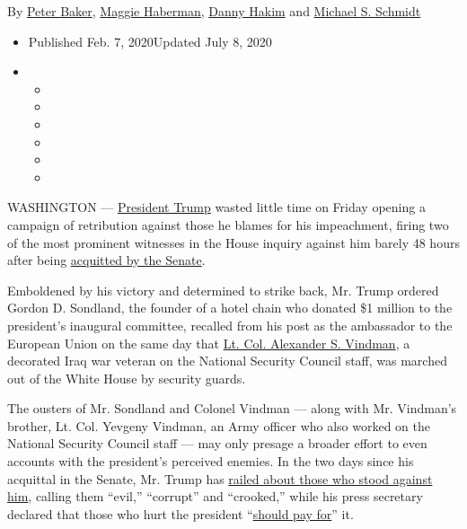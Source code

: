By \href{https://www.nytimes.com/by/peter-baker}{Peter Baker},
\href{https://www.nytimes.com/by/maggie-haberman}{Maggie Haberman},
\href{https://www.nytimes.com/by/danny-hakim}{Danny Hakim} and
\href{https://www.nytimes.com/by/michael-s-schmidt}{Michael S. Schmidt}

\begin{itemize}
\item
  Published Feb. 7, 2020Updated July 8, 2020
\item
  \begin{itemize}
  \item
  \item
  \item
  \item
  \item
  \item
  \end{itemize}
\end{itemize}

WASHINGTON ---
\href{https://www.nytimes.com/2020/02/14/podcasts/the-daily/trump-acquittal.html?action=click\&module=Briefings\&pgtype=Homepage}{President
Trump} wasted little time on Friday opening a campaign of retribution
against those he blames for his impeachment, firing two of the most
prominent witnesses in the House inquiry against him barely 48 hours
after being
\href{https://www.nytimes.com/2020/02/05/us/politics/trump-acquitted-impeachment.html}{acquitted
by the Senate}.

Emboldened by his victory and determined to strike back, Mr. Trump
ordered Gordon D. Sondland, the founder of a hotel chain who donated \$1
million to the president's inaugural committee, recalled from his post
as the ambassador to the European Union on the same day that
\href{https://www.nytimes.com/2020/07/08/us/politics/vindman-trump-ukraine-impeachment.html}{Lt.
Col. Alexander S. Vindman}, a decorated Iraq war veteran on the National
Security Council staff, was marched out of the White House by security
guards.

The ousters of Mr. Sondland and Colonel Vindman --- along with Mr.
Vindman's brother, Lt. Col. Yevgeny Vindman, an Army officer who also
worked on the National Security Council staff --- may only presage a
broader effort to even accounts with the president's perceived enemies.
In the two days since his acquittal in the Senate, Mr. Trump has
\href{https://www.nytimes.com/2020/02/06/us/politics/trump-impeachment.html}{railed
about those who stood against him}, calling them ``evil,'' ``corrupt''
and ``crooked,'' while his press secretary declared that those who hurt
the president
``\href{https://www.foxnews.com/media/stephanie-grisham-dems-must-be-held-accountable-for-corrupt-impeachment}{should
pay for}'' it.

